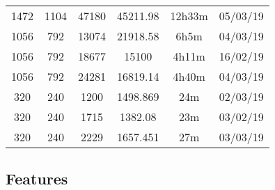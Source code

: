 \begin{center}
\begin{tabular}{ c c c | c c c }
  1472 & 1104 & 47180 & 45211.98 & 12h33m & 05/03/19 \\
  1056 & 792 & 13074 & 21918.58 & 6h5m & 04/03/19 \\
  1056 & 792 & 18677 & 15100 & 4h11m & 16/02/19 \\
  1056 & 792 & 24281 & 16819.14 & 4h40m & 04/03/19 \\
  320 & 240 & 1200 & 1498.869 & 24m & 02/03/19 \\
  320 & 240 & 1715 & 1382.08 & 23m & 03/02/19 \\
  320 & 240 & 2229 & 1657.451 & 27m & 03/03/19 \\
  \end{tabular}
  \end{center}

\newpage
\subsection{Features}
